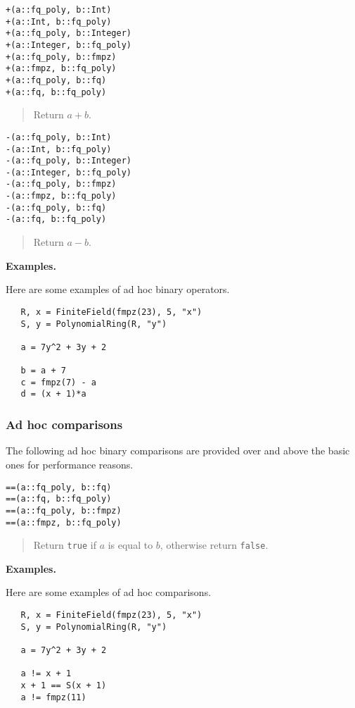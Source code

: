 \documentclass[a4paper,10pt]{article}
\newcommand{\code}{\lstinline}
\newcommand{\desc}[1]{\vspace{-3mm}\begin{quote}#1\end{quote}}
\begin{document}
{{\begin{lstlisting}
+(a::fq_poly, b::Int)
+(a::Int, b::fq_poly)
+(a::fq_poly, b::Integer)
+(a::Integer, b::fq_poly)
+(a::fq_poly, b::fmpz)
+(a::fmpz, b::fq_poly)
+(a::fq_poly, b::fq)
+(a::fq, b::fq_poly)
\end{lstlisting}

\desc{Return $a + b$.}

\begin{lstlisting}
-(a::fq_poly, b::Int)
-(a::Int, b::fq_poly)
-(a::fq_poly, b::Integer)
-(a::Integer, b::fq_poly)
-(a::fq_poly, b::fmpz)
-(a::fmpz, b::fq_poly)
-(a::fq_poly, b::fq)
-(a::fq, b::fq_poly)
\end{lstlisting}

\desc{Return $a - b$.}

\textbf{Examples.}

Here are some examples of ad hoc binary operators.

\begin{lstlisting}
   R, x = FiniteField(fmpz(23), 5, "x")
   S, y = PolynomialRing(R, "y")

   a = 7y^2 + 3y + 2

   b = a + 7
   c = fmpz(7) - a
   d = (x + 1)*a
\end{lstlisting}

\subsubsection{Ad hoc comparisons}

The following ad hoc binary comparisons are provided over and above the basic ones
for performance reasons.

\begin{lstlisting}
==(a::fq_poly, b::fq)
==(a::fq, b::fq_poly)
==(a::fq_poly, b::fmpz)
==(a::fmpz, b::fq_poly)
\end{lstlisting}

\desc{Return \code{true} if $a$ is equal to $b$, otherwise return \code{false}.}

\textbf{Examples.}

Here are some examples of ad hoc comparisons.

\begin{lstlisting}
   R, x = FiniteField(fmpz(23), 5, "x")
   S, y = PolynomialRing(R, "y")

   a = 7y^2 + 3y + 2

   a != x + 1
   x + 1 == S(x + 1)
   a != fmpz(11)
\end{lstlisting}

}}
\end{document}
